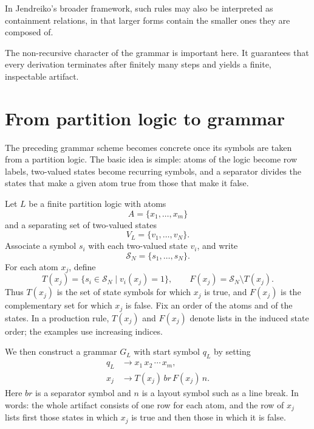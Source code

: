 \documentclass[
  10pt,
  twocolumn,
  aps,
  pra,
  showkeys,
  amsmath,amssymb,
  longbibliography
]{revtex4-2}
\begin{document}
In Jendreiko's broader framework, such rules may also be interpreted as containment relations, in that larger forms contain the smaller ones they are composed of.

The non-recursive character of the grammar is important here. It guarantees that every derivation terminates after finitely many steps and yields a finite, inspectable artifact.

\section{From partition logic to grammar}

The preceding grammar scheme becomes concrete once its symbols are taken from a partition logic. The basic idea is simple: atoms of the logic become row labels, two-valued states become recurring symbols, and a separator divides the states that make a given atom true from those that make it false.

Let \(L\) be a finite partition logic with atoms
\begin{equation}
A=\{x_1,\dots,x_m\}
\end{equation}
and a separating set of two-valued states
\begin{equation}
V_L=\{v_1,\dots,v_N\}.
\end{equation}
Associate a symbol \(s_i\) with each two-valued state \(v_i\), and write
\begin{equation}
\mathcal{S}_N=\{s_1,\dots,s_N\}.
\end{equation}
For each atom \(x_j\), define
\begin{equation}
T(x_j)=\{s_i\in\mathcal{S}_N \mid v_i(x_j)=1\},
\qquad
F(x_j)=\mathcal{S}_N\setminus T(x_j).
\label{eq:tfsets}
\end{equation}
Thus \(T(x_j)\) is the set of state symbols for which \(x_j\) is true, and \(F(x_j)\) is the complementary set for which \(x_j\) is false. Fix an order of the atoms and of the states. In a production rule, \(T(x_j)\) and \(F(x_j)\) denote lists in the induced state order; the examples use increasing indices.

We then construct a grammar \(G_L\) with start symbol \(q_L\) by setting
\begin{align}
q_L &\to x_1\,x_2\,\cdots\,x_m,
\label{eq:startrule2}
\\
x_j &\to T(x_j)\,br\,F(x_j)\,n.
\label{eq:rowrule2}
\end{align}
Here \(br\) is a separator symbol and \(n\) is a layout symbol such as a line break. In words: the whole artifact consists of one row for each atom, and the row of \(x_j\) lists first those states in which \(x_j\) is true and then those in which it is false.
\end{document}
